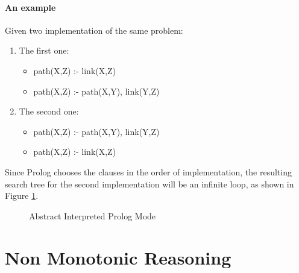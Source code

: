 \documentclass[10pt,a4paper]{article}
\begin{document}
\paragraph{An example}
Given two implementation of the same problem:
\begin{enumerate}
\item The first one:
	\begin{itemize}
	\item path(X,Z) :- link(X,Z)
	\item path(X,Z) :- path(X,Y), link(Y,Z)
	\end{itemize}
\item The second one:
	\begin{itemize}
	\item path(X,Z) :- path(X,Y), link(Y,Z)
	\item path(X,Z) :- link(X,Z)
	\end{itemize}
\end{enumerate}

Since Prolog chooses the clauses in the order of implementation, the resulting search tree for the second implementation will be an infinite loop, as shown in Figure \ref{fig:prolog_tree}.


\begin{figure}[H]
\centering
{}
\caption{Abstract Interpreted Prolog Mode}
\label{fig:prolog_tree}
\end{figure}

\newpage

\section{Non Monotonic Reasoning}
\end{document}
